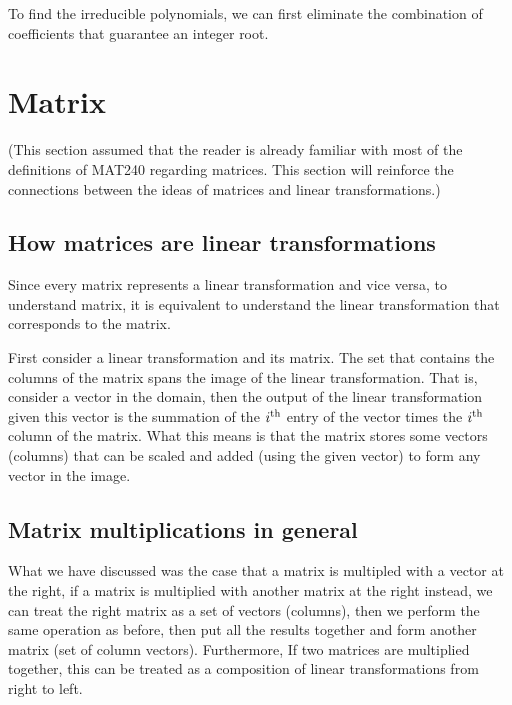 \documentclass[11pt, cyan, night, 1in]{LatexTemplate/hw}
\begin{document}

To find the irreducible polynomials, we can first eliminate the combination of coefficients that guarantee an integer root. 


\section{Matrix}

(This section assumed that the reader is already familiar with most of the definitions of MAT240 regarding matrices. This section will reinforce the connections between the ideas of matrices and linear transformations.)

\subsection{How matrices are linear transformations}

Since every matrix represents a linear transformation and vice versa, to understand matrix, it is equivalent to understand the linear transformation that corresponds to the matrix.

First consider a linear transformation and its matrix. The set that contains the columns of the matrix spans the image of the linear transformation. That is, consider a vector in the domain, then the output of the linear transformation given this vector is the summation of the $i^{\text{th}}$ entry of the vector times the $i^{\text{th}}$ column of the matrix. What this means is that the matrix stores some vectors (columns) that can be scaled and added (using the given vector) to form any vector in the image.

\subsection{Matrix multiplications in general}

What we have discussed was the case that a matrix is multipled with a vector at the right, if a matrix is multiplied with another matrix at the right instead, we can treat the right matrix as a set of vectors (columns), then we perform the same operation as before, then put all the results together and form another matrix (set of column vectors). Furthermore, If two matrices are multiplied together, this can be treated as a composition of linear transformations from right to left.
\end{document}
